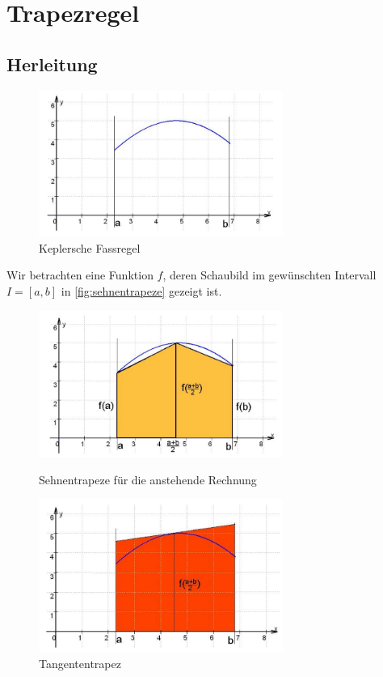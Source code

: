 \section{Trapezregel}
\label{sec:trapezregel}

\subsection{Herleitung}
\label{sec:herleitung}

\begin{figure}[h]
    \centering
    \includegraphics[width=8cm]{Bilder/keplersche_fassregel_funktion.png}
    \caption{Keplersche Fassregel \cite{skript}}    
    \label{fig:keplersche_fassregel}
\end{figure}
Wir betrachten eine Funktion $f$, deren Schaubild im gewünschten Intervall $I = [a, b]$ in \autoref{fig:sehnentrapeze} gezeigt ist.

\begin{figure}[!tbp]
    \centering
    \begin{minipage}[b]{0.4\textwidth}
        \includegraphics[width=8cm]{Bilder/sehnentrapeze.png}
      \caption{Sehnentrapeze für die anstehende Rechnung}
    \end{minipage}
    \hfill
    \begin{minipage}[b]{0.4\textwidth}
        \includegraphics[width=8cm]{Bilder/sehnentrapez_addiert.png}
      \caption{Tangententrapez  \cite{skript}}
    \end{minipage}
    \label{fig:sehnentrapeze}
  \end{figure}

